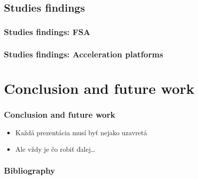\documentclass{beamer}
\begin{document}
\subsection{Studies findings}
\begin{frame}[fragile=singleslide]\frametitle{Studies findings: FSA}

\end{frame}

\begin{frame}[fragile=singleslide]\frametitle{Studies findings: Acceleration platforms}

\end{frame}













\section*{Conclusion and future work}

\begin{frame}[fragile=singleslide]\frametitle{Conclusion and future work}
	\begin{itemize}
		\item Každá prezentácia musí byť nejako uzavretá
		\item Ale vždy je čo robiť ďalej\ldots{}
	\end{itemize}
\end{frame}

\begin{frame}[fragile=singleslide]\frametitle{Bibliography}
	\fontsize{4.5}{1}
	
	
\end{frame}
\end{document}

